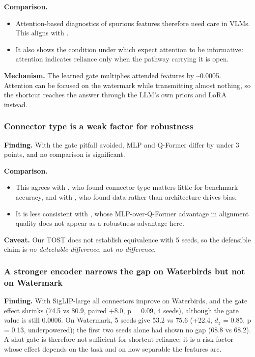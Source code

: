 \textbf{Comparison.}

\begin{itemize}
\item
  Attention-based diagnostics of spurious features \cite{chakraborty2024exmap,lapuschkin2019clever} therefore
  need care in VLMs. This aligns with \cite{jain2019attention}.
\item
  It also shows the condition under which \cite{wiegreffe2019attention} expect attention to be informative:
  attention indicates reliance only when the pathway carrying it is open.
\end{itemize}

\textbf{Mechanism.} The learned gate multiplies attended features by \textasciitilde0.0005. Attention can be focused on the
watermark while transmitting almost nothing, so the shortcut reaches the answer through the LLM's own priors
and LoRA instead.

\subsubsection{Connector type is a weak factor for robustness}

\textbf{Finding.} With the gate pitfall avoided, MLP and Q-Former differ by under 3 points, and no comparison is
significant.

\textbf{Comparison.}

\begin{itemize}
\item
  This agrees with \cite{mckinzie2024mm1}, who found connector type matters little for benchmark accuracy, and
  with \cite{sarridis2026scaling}, who found data rather than architecture drives bias.
\item
  It is less consistent with \cite{huang2024mir}, whose MLP-over-Q-Former advantage in alignment quality does not
  appear as a robustness advantage here.
\end{itemize}

\textbf{Caveat.} Our TOST does not establish equivalence with 5 seeds, so the defensible claim is
\emph{no detectable difference}, not \emph{no difference}.

\subsubsection{A stronger encoder narrows the gap on Waterbirds but not on Watermark}

\textbf{Finding.} With SigLIP-large all connectors improve on Waterbirds, and the gate effect shrinks (74.5 vs 80.9,
paired +8.0, p = 0.09, 4 seeds), although the gate value is still 0.0006. On Watermark, 5 seeds give 53.2 vs 75.6
(+22.4, \(d_z\) = 0.85, p = 0.13, underpowered); the first two seeds alone had shown no gap (68.8 vs 68.2).
A shut gate is therefore not sufficient for shortcut reliance: it is a risk factor whose effect depends on the task
and on how separable the features are.

